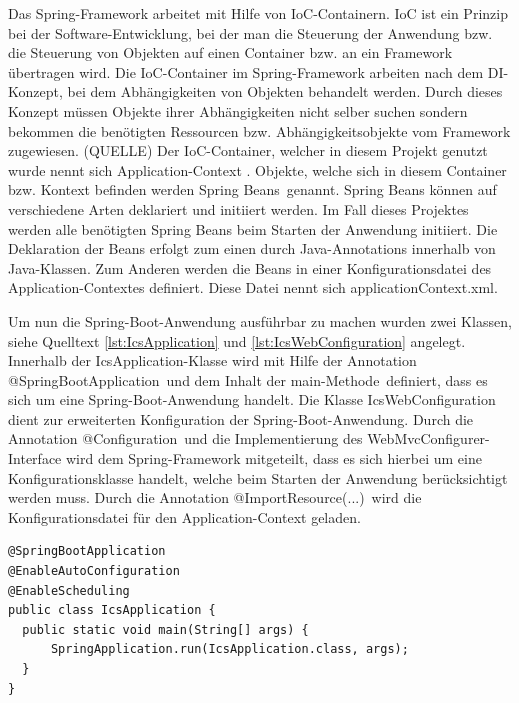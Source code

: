 	Das Spring-Framework arbeitet mit Hilfe von \ac{IoC}-Containern. \ac{IoC} ist ein Prinzip bei der Software-Entwicklung, bei der man die Steuerung der Anwendung bzw. die Steuerung von Objekten auf einen Container bzw. an ein Framework übertragen wird. Die \ac{IoC}-Container im Spring-Framework arbeiten nach dem \ac{DI}-Konzept, bei dem Abhängigkeiten von Objekten behandelt werden. Durch dieses Konzept müssen Objekte ihrer Abhängigkeiten nicht selber suchen sondern bekommen die benötigten Ressourcen bzw. Abhängigkeitsobjekte vom Framework zugewiesen. (QUELLE) Der \ac{IoC}-Container, welcher in diesem Projekt genutzt wurde nennt sich \glqq Application-Context \grqq. Objekte, welche sich in diesem Container bzw. Kontext befinden werden \glqq Spring Beans\grqq \, genannt. Spring Beans können auf verschiedene Arten deklariert und initiiert werden. Im Fall dieses Projektes werden alle benötigten Spring Beans beim Starten der Anwendung initiiert. Die Deklaration der Beans erfolgt zum einen durch Java-Annotations innerhalb von Java-Klassen. Zum Anderen werden die Beans in einer Konfigurationsdatei des Application-Contextes definiert. Diese Datei nennt sich \glqq applicationContext.xml\grqq.

	Um nun die Spring-Boot-Anwendung ausführbar zu machen wurden zwei Klassen, siehe Quelltext \ref{lst:IcsApplication} und \ref{lst:IcsWebConfiguration} angelegt. Innerhalb der \glqq IcsApplication\grqq -Klasse wird mit Hilfe der Annotation \glqq @SpringBootApplication\grqq \, und dem Inhalt der \glqq main-Methode\grqq \, definiert, dass es sich um eine Spring-Boot-Anwendung handelt. Die Klasse \glqq IcsWebConfiguration\grqq \, dient zur erweiterten Konfiguration der Spring-Boot-Anwendung. Durch die Annotation \glqq @Configuration\grqq \, und die Implementierung des \glqq WebMvcConfigurer\grqq -Interface wird dem Spring-Framework mitgeteilt, dass es sich hierbei um eine Konfigurationsklasse handelt, welche beim Starten der Anwendung berücksichtigt werden muss. Durch die Annotation \glqq @ImportResource(...)\grqq \, wird die Konfigurationsdatei für den Application-Context geladen.

\lstset{language=Java}
\begin{lstlisting}[caption={IcsApplication.java}, label={lst:IcsApplication}]
@SpringBootApplication
@EnableAutoConfiguration
@EnableScheduling
public class IcsApplication {
  public static void main(String[] args) {
	  SpringApplication.run(IcsApplication.class, args);
  }
}
\end{lstlisting}

